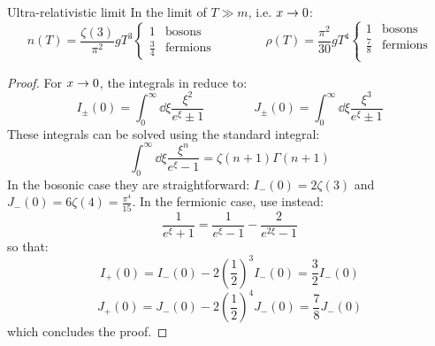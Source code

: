 \begin{lemma}{Ultra-relativistic limit}{}
  In the limit of $ T \gg m $, i.e. $ x \rightarrow 0 $:
  \begin{equation}
    n(T) = \frac{\zeta(3)}{\pi^2} g T^3
    \begin{cases}
      1 & \text{bosons} \\
      \tfrac{3}{4} & \text{fermions}
    \end{cases}
    \qquad \qquad
    \rho(T) = \frac{\pi^2}{30} g T^4
    \begin{cases}
      1 & \text{bosons} \\
      \tfrac{7}{8} & \text{fermions} \\
    \end{cases}
    \label{eq:ultra-rel}
  \end{equation}
\end{lemma}

\begin{proofbox}
  \begin{proof}
    For $ x \rightarrow 0 $, the integrals in  reduce to:
    \begin{equation*}
      I_\pm(0) = \int_0^\infty \dd \xi \frac{\xi^2}{e^\xi \pm 1}
      \qquad \qquad
      J_\pm(0) = \int_0^\infty \dd \xi \frac{\xi^3}{e^\xi \pm 1}
    \end{equation*}
    These integrals can be solved using the standard integral:
    \begin{equation}
      \int_0^\infty \dd \xi \frac{\xi^n}{e^\xi - 1} = \zeta(n + 1) \Gamma(n + 1)
    \end{equation}
    In the bosonic case they are straightforward: $ I_-(0) = 2 \zeta(3) $ and $ J_-(0) = 6 \zeta(4) = \frac{\pi^4}{15} $. In the fermionic case, use instead:
    \begin{equation*}
      \frac{1}{e^\xi + 1} = \frac{1}{e^\xi - 1} - \frac{2}{e^{2\xi} - 1}
    \end{equation*}
    so that:
    \begin{equation*}
      I_+(0) = I_-(0) - 2 \left( \frac{1}{2} \right)^3 I_-(0) = \frac{3}{2} I_-(0)
    \end{equation*}
    \begin{equation*}
      J_+(0) = J_-(0) - 2 \left( \frac{1}{2} \right)^4 J_-(0) = \frac{7}{8} J_-(0)
    \end{equation*}
    which concludes the proof.
  \end{proof}
\end{proofbox}

